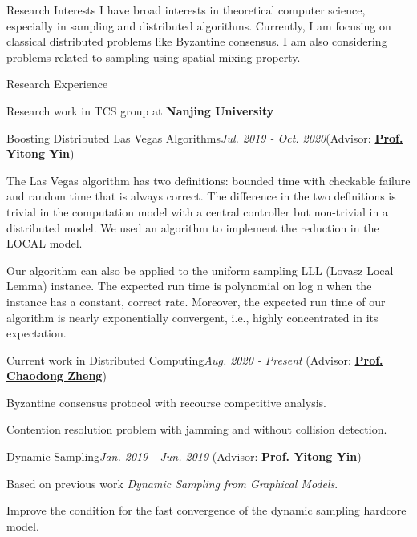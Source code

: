\documentclass{resume} %
\begin{document}
\begin{rSection}{Research Interests}
I have broad interests in theoretical computer science, especially in sampling and distributed algorithms. Currently, I am focusing on classical distributed problems like Byzantine consensus. I am also considering problems related to sampling using spatial mixing property.
\end{rSection}
\begin{rSection}{Research Experience}

{\large Research work in TCS group at {\bf Nanjing University} }

\begin{rSubsection}{Boosting Distributed Las Vegas Algorithms}{\em Jul. 2019 - Oct. 2020}{(Advisor: \href{http://tcs.nju.edu.cn/yinyt/}{\bf Prof. Yitong Yin})}{}
\item The Las Vegas algorithm has two  definitions:  bounded time with  checkable failure and random time that is always correct.  The difference in the two definitions is trivial in the computation model with a central controller but non-trivial in a distributed model. We used an algorithm to implement the reduction in the LOCAL model.
\item Our algorithm can also be applied to the uniform sampling LLL (Lovasz Local Lemma) instance.  The expected run time is polynomial on log n when the instance has a constant, correct rate. Moreover, the expected run time of our algorithm is nearly exponentially convergent, i.e., highly concentrated in its expectation.
\end{rSubsection}
\begin{rSubsection}{Current work in Distributed Computing}{\em Aug. 2020 - Present}{ (Advisor: \href{https://chaodong.me/}{\bf Prof. Chaodong Zheng})}{}
\item Byzantine consensus protocol with recourse competitive analysis.
\item Contention resolution problem with jamming and without collision detection.
\end{rSubsection}
\begin{rSubsection}{Dynamic Sampling}{\em Jan. 2019 - Jun. 2019}{ (Advisor: \href{http://tcs.nju.edu.cn/yinyt/}{\bf Prof. Yitong Yin})}{}
\item Based on previous work {\em Dynamic Sampling from Graphical Models}.
\item Improve the condition for the fast convergence of the dynamic sampling hardcore model.
\end{rSubsection}
\end{rSection}
\end{document}
